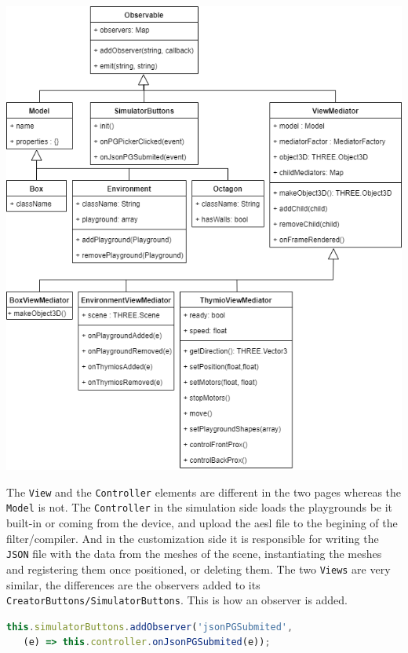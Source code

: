 \documentclass{scrbook}
\begin{document}
\begin{center}
  \includegraphics[width=\textwidth]{./mvc_cd}
\end{center}

The \texttt{View} and the \texttt{Controller} elements are different in the two pages whereas the \texttt{Model} is not. The \texttt{Controller} in the simulation side loads the playgrounds be it built-in or coming from the device, and upload the aesl file to the begining of the filter/compiler. 
And in the customization side it is responsible for writing the \texttt{JSON} file with the data from the meshes of the scene,  instantiating the meshes and registering them once positioned, or deleting them. The two \texttt{Views} are very similar, 
the differences are the observers added to its \texttt{CreatorButtons/SimulatorButtons}. This is how an observer is added.

\begin{lstlisting}[language=JavaScript, gobble=2, basicstyle=\ttfamily\small]
  this.simulatorButtons.addObserver('jsonPGSubmited',
   (e) => this.controller.onJsonPGSubmited(e));
\end{lstlisting} 
\end{document}
